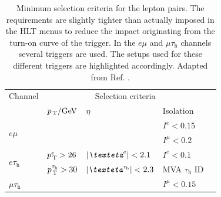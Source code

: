 \begin{table}[h]
    \centering
    \caption[Baseline selection of lepton pairs.]{Minimum selection criteria for the lepton pairs. The requirements are slightly tighter than actually imposed in the HLT menus to reduce the impact originating from the turn-on curve of the trigger. In the $e\mu$ and $\mu\tau_\text{h}$ channels several triggers are used. The setups used for these different triggers are highlighted accordingly. Adapted from Ref. \cite{Sirunyan:2017khh}.}\label{ES:tab:channels}
    \begin{tabular}{lllll}
        \toprule
        Channel                       & \multicolumn{3}{c}{Selection criteria}                       \\ \cline{2-4}
                                      & $p_\text{\,T} / \text{GeV}$                    & $\eta$                              & Isolation \\ \midrule
\multirow{4}{*}{$e\mu$}               & \cellcolor{ctcolormain!20}{$p_\text{\,T}^e > \text{13}$  }                 & \cellcolor{ctcolormain!20}{$\abs{\eta^e}<\text{2.5}$    }              & \multirow{2}{*}{$I^e < \text{0.15}$} \\
                                      & \cellcolor{ctcolormain!20}{$p_\text{\,T}^\mu > \text{24}$}                 & \cellcolor{ctcolormain!20}{$\abs{\eta^\mu}<\text{2.4}$  }              &                               \\
                                      & \cellcolor{ctcoloraccessory!20}{$p_\text{\,T}^e > \text{24}$      }            & \cellcolor{ctcoloraccessory!20}{$\abs{\eta^e}<\text{2.5}$   }               & \multirow{2}{*}{$I^\mu < \text{0.2}$}   \\
                                      & \cellcolor{ctcoloraccessory!20}{$p_\text{\,T}^\mu > \text{15} $   }            & \cellcolor{ctcoloraccessory!20}{$\abs{\eta^\mu}<\text{2.4}$ }               &                               \\ \midrule
\multirow{2}{*}{$e\tau_\text{h}$}     & $p_\text{\,T}^e > \text{26}$                   & $\abs{\eta^e} < \text{2.1}$                  & $I^e < \text{0.1}$       \\
                                      & $p_\text{\,T}^{\tau_\text{h}} > \text{30}$   & $\abs{\eta^{\tau_\text{h}}}< \text{2.3}$  &  MVA  $\tau_\text{h}$ ID \\  \midrule 
\multirow{4}{*}{$\mu\tau_\text{h}$}   & \cellcolor{ctcolormain!20}{$p_\text{\,T}^\mu > \text{23}$               }  & \cellcolor{ctcolormain!20}{$\abs{\eta^\mu}<\text{2.1}$               } & \multirow{2}{*}{$I^\mu < \text{0.15}$} \\

\end{tabular}
\end{table}
